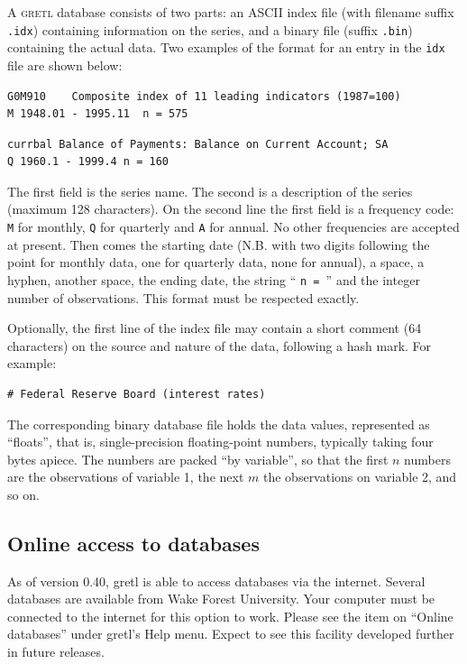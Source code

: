 \documentclass{article}
\begin{document}
A \textsc{gretl} database consists of two parts: an ASCII index file
(with filename suffix \texttt{.idx}) containing information on the
series, and a binary file (suffix \texttt{.bin}) containing the actual
data.  Two examples of the format for an entry in the \texttt{idx}
file are shown below:

\begin{verbatim}
G0M910    Composite index of 11 leading indicators (1987=100)
M 1948.01 - 1995.11  n = 575
\end{verbatim}

\begin{verbatim}
currbal Balance of Payments: Balance on Current Account; SA
Q 1960.1 - 1999.4 n = 160
\end{verbatim}
  
The first field is the series name.  The second is a description of
the series (maximum 128 characters).  On the second line the first
field is a frequency code: \texttt{M} for monthly, \texttt{Q} for
quarterly and \texttt{A} for annual.  No other frequencies are
accepted at present.  Then comes the starting date (N.B. with two
digits following the point for monthly data, one for quarterly data,
none for annual), a space, a hyphen, another space, the ending date,
the string `` \texttt{n = }'' and the integer number of observations.
This format must be respected exactly.

Optionally, the first line of the index file may contain a short
comment (64 characters) on the source and nature of the data,
following a hash mark.  For example:

\begin{verbatim}
# Federal Reserve Board (interest rates)
\end{verbatim}

The corresponding binary database file holds the data values,
represented as ``floats'', that is, single-precision floating-point
numbers, typically taking four bytes apiece.  The numbers are packed
``by variable'', so that the first $n$ numbers are the observations of
variable 1, the next $m$ the observations on variable 2, and so on.

\subsection{Online access to databases}

As of version 0.40, \textsf{gretl} is able to access databases via the
internet.  Several databases are available from Wake Forest
University.  Your computer must be connected to the internet for this
option to work.  Please see the item on ``Online databases'' under
\textsf{gretl}'s Help menu.  Expect to see this facility developed
further in future releases.
\end{document}
